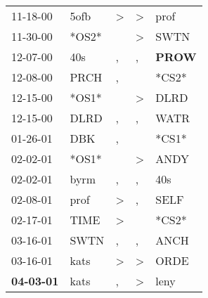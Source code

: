\begin{supertabular}{p{0.07\textwidth}p{0.06\textwidth}p{0.02\textwidth}p{0.02\textwidth}p{0.06\textwidth}}
          11-18-00\textsuperscript{} &           5ofb\textsuperscript{} &     \textgreater &     \textgreater &           prof\textsuperscript{} \\
          11-30-00\textsuperscript{} &                            *OS2* &                  &     \textgreater &           SWTN\textsuperscript{} \\
          12-07-00\textsuperscript{} &            40s\textsuperscript{} &                , &                , &  \textbf{PROW\textsuperscript{}} \\
          12-08-00\textsuperscript{} &           PRCH\textsuperscript{} &                , &                  &                            *CS2* \\
          12-15-00\textsuperscript{} &                            *OS1* &                  &     \textgreater &           DLRD\textsuperscript{} \\
          12-15-00\textsuperscript{} &           DLRD\textsuperscript{} &                , &                , &           WATR\textsuperscript{} \\
          01-26-01\textsuperscript{} &            DBK\textsuperscript{} &                , &                  &                            *CS1* \\
          02-02-01\textsuperscript{} &                            *OS1* &                  &     \textgreater &           ANDY\textsuperscript{} \\
          02-02-01\textsuperscript{} &           byrm\textsuperscript{} &                , &                , &            40s\textsuperscript{} \\
          02-08-01\textsuperscript{} &           prof\textsuperscript{} &     \textgreater &                , &           SELF\textsuperscript{} \\
          02-17-01\textsuperscript{} &           TIME\textsuperscript{} &     \textgreater &                  &                            *CS2* \\
          03-16-01\textsuperscript{} &           SWTN\textsuperscript{} &                , &                , &           ANCH\textsuperscript{} \\
          03-16-01\textsuperscript{} &           kats\textsuperscript{} &     \textgreater &     \textgreater &           ORDE\textsuperscript{} \\
 \textbf{04-03-01\textsuperscript{}} &           kats\textsuperscript{} &                , &     \textgreater &           leny\textsuperscript{} \\

\end{supertabular}
